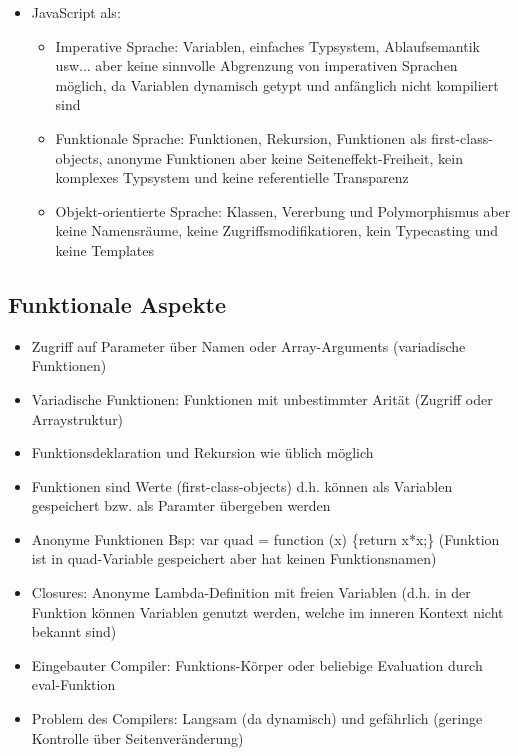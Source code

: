 \documentclass{article} %
\begin{document}
\begin{itemize}
		\item JavaScript als:
		\begin{itemize}
			\item Imperative Sprache: Variablen, einfaches Typsystem, Ablaufsemantik usw... aber keine sinnvolle Abgrenzung von imperativen Sprachen möglich, da Variablen dynamisch getypt und anfänglich nicht kompiliert sind
			\item Funktionale Sprache: Funktionen, Rekursion, Funktionen als first-class-objects, anonyme Funktionen aber keine Seiteneffekt-Freiheit, kein komplexes Typsystem und keine referentielle Transparenz
			\item Objekt-orientierte Sprache: Klassen, Vererbung und Polymorphismus aber keine Namensräume, keine Zugriffsmodifikatioren, kein Typecasting und keine Templates
		\end{itemize}
	\end{itemize}
	\subsection{Funktionale Aspekte}
	\begin{itemize}
		\item Zugriff auf Parameter über Namen oder Array-Arguments (variadische Funktionen)
		\item Variadische Funktionen: Funktionen mit unbestimmter Arität (Zugriff oder Arraystruktur)
		\item Funktionsdeklaration und Rekursion wie üblich möglich
		\item Funktionen sind Werte (first-class-objects) d.h. können als Variablen gespeichert bzw. als Paramter übergeben werden
		\item Anonyme Funktionen Bsp: var quad = function (x) \{return x*x;\} (Funktion ist in quad-Variable gespeichert aber hat keinen Funktionsnamen)
		\item Closures: Anonyme Lambda-Definition mit freien Variablen (d.h. in der Funktion können Variablen genutzt werden, welche im inneren Kontext nicht bekannt sind)
		\item Eingebauter Compiler: Funktions-Körper oder beliebige Evaluation durch eval-Funktion
		\item Problem des Compilers: Langsam (da dynamisch) und gefährlich (geringe Kontrolle über Seitenveränderung)
	\end{itemize}
\end{document}
